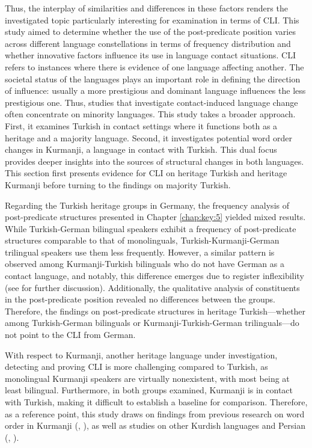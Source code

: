 Thus, the interplay of similarities and differences in these factors renders the investigated topic particularly interesting for examination in terms of CLI. This study aimed to determine whether the use of the post-predicate position varies across different language constellations in terms of frequency distribution and whether innovative factors influence its use in language contact situations. CLI refers to instances where there is evidence of one language affecting another. The societal status of the languages plays an important role in defining the direction of influence: usually a more prestigious and dominant language influences the less prestigious one. Thus, studies that investigate contact-induced language change often concentrate on minority languages. This study takes a broader approach. First, it examines Turkish in contact settings where it functions both as a heritage and a majority language. Second, it investigates potential word order changes in Kurmanji, a language in contact with Turkish. This dual focus provides deeper insights into the sources of structural changes in both languages. This section first presents evidence for CLI on heritage Turkish and heritage Kurmanji before turning to the findings on majority Turkish.

Regarding the Turkish heritage groups in Germany, the frequency analysis of post-predicate structures presented in Chapter \ref{chap:key:5} yielded mixed results. While Turkish-German bilingual speakers exhibit a frequency of post-predicate structures comparable to that of monolinguals, Turkish-Kurmanji-German trilingual speakers use them less frequently. However, a similar pattern is observed among Kurmanji-Turkish bilinguals who do not have German as a contact language, and notably, this difference emerges due to register inflexibility (see  for further discussion). Additionally, the qualitative analysis of constituents in the post-predicate position revealed no differences between the groups. Therefore, the findings on post-predicate structures in heritage Turkish—whether among Turkish-German bilinguals or Kurmanji-Turkish-German trilinguals—do not point to the CLI from German.

With respect to Kurmanji, another heritage language under investigation, detecting and proving CLI is more challenging compared to Turkish, as monolingual Kurmanji speakers are virtually nonexistent, with most being at least bilingual. Furthermore, in both groups examined, Kurmanji is in contact with Turkish, making it difficult to establish a baseline for comparison. Therefore, as a reference point, this study draws on findings from previous research on word order in Kurmanji (\citealt{Haig2014}, \citealt{Haig2018, Gundogdu2019}), as well as studies on other Kurdish languages \citep{Asadpour2021} and Persian (\citealt{Frommer1981}, \citealt{Haig_post-predicate_EtAl2024-1}).

